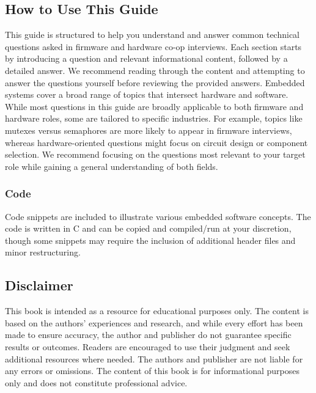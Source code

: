 \documentclass[main.tex]{subfiles}
\begin{document}
\subsection{How to Use This Guide}
This guide is structured to help you understand and answer common technical questions asked in firmware and hardware co-op interviews. Each section starts by introducing a question and relevant informational content, followed by a detailed answer. We recommend reading through the content and attempting to answer the questions yourself before reviewing the provided answers.
\newline
\newnoindentpara Embedded systems cover a broad range of topics that intersect hardware and software. While most questions in this guide are broadly applicable to both firmware and hardware roles, some are tailored to specific industries. For example, topics like mutexes versus semaphores are more likely to appear in firmware interviews, whereas hardware-oriented questions might focus on circuit design or component selection. We recommend focusing on the questions most relevant to your target role while gaining a general understanding of both fields.

\subsubsection{Code}
Code snippets are included to illustrate various embedded software concepts. The code is written in C and can be copied and compiled/run at your discretion, though some snippets may require the inclusion of additional header files and minor restructuring.

\subsection{Disclaimer}
This book is intended as a resource for educational purposes only. The content is based on the authors' experiences and research, and while every effort has been made to ensure accuracy, the author and publisher do not guarantee specific results or outcomes. Readers are encouraged to use their judgment and seek additional resources where needed. The authors and publisher are not liable for any errors or omissions. The content of this book is for informational purposes only and does not constitute professional advice.
\end{document}
